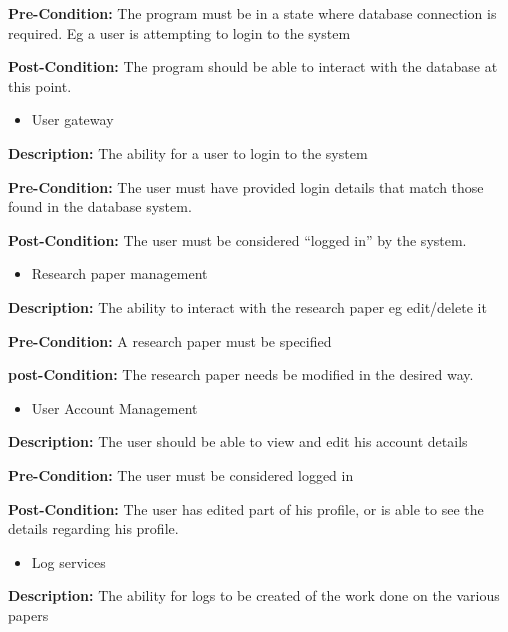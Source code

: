 \documentclass[11pt]{article}
\begin{document}
{\raggedright
	\textbf{Pre-Condition: }The program must be in a state where database connection
	is required. Eg a user is attempting to login to the system
}

{\raggedright
	\textbf{Post-Condition: }The program should be able to interact with the
	database at this point.
}

\begin{itemize}
	\item User gateway
\end{itemize}

{\raggedright
	\textbf{Description: }The ability for a user to login to the system
}

{\raggedright
	\textbf{Pre-Condition: }The user must have provided login details that match
	those found in the database system.
}

{\raggedright
	\textbf{Post-Condition: }The user must be considered “logged in” by the system.
}

\begin{itemize}
	\item Research paper management
\end{itemize}

{\raggedright
	\textbf{Description: }The ability to interact with the research paper eg
	edit/delete it
}

{\raggedright
	\textbf{Pre-Condition: }A research paper must be specified
}

{\raggedright
	\textbf{post-Condition: }The research paper needs be modified in the desired
	way.
}

\begin{itemize}
	\item User Account Management
\end{itemize}

{\raggedright
	\textbf{Description: }The user should be able to view and edit his account details
}

{\raggedright
	\textbf{Pre-Condition: }The user must be considered logged in
}

{\raggedright
	\textbf{Post-Condition: }The user has edited part of his profile, or is able to see the details regarding his profile.
}

\begin{itemize}
	\item Log services
\end{itemize}

{\raggedright
	\textbf{Description: }The ability for logs to be created of the work done on the various papers
}
\end{document}
